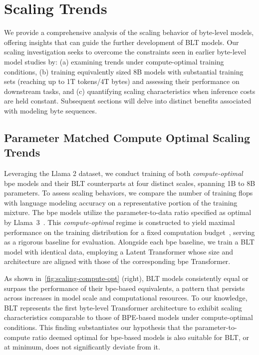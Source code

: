 \section{Scaling Trends}
\label{section:scaling}

We provide a comprehensive analysis of the scaling behavior of byte-level models, offering insights that can guide the further development of {\textsc BLT} models. Our scaling investigation seeks to overcome the constraints seen in earlier byte-level model studies by: (a) examining trends under compute-optimal training conditions, (b) training equivalently sized 8B models with substantial training sets (reaching up to 1T tokens/4T bytes) and assessing their performance on downstream tasks, and (c) quantifying scaling characteristics when inference costs are held constant. Subsequent sections will delve into distinct benefits associated with modeling byte sequences.

\subsection{Parameter Matched Compute Optimal Scaling Trends}
\label{section:parameter-matched-scaling}
Leveraging the Llama 2 dataset, we conduct training of both \textit{compute-optimal} bpe models and their {\textsc BLT} counterparts at four distinct scales, spanning 1B to 8B parameters. To assess scaling behaviors, we compare the number of training flops with language modeling accuracy on a representative portion of the training mixture. The bpe models utilize the parameter-to-data ratio specified as optimal by Llama~3~\citep{dubey2024llama}. This \textit{compute-optimal} regime is constructed to yield maximal performance on the training distribution for a fixed computation budget~\citep{hoffmann2022training}, serving as a rigorous baseline for evaluation. Alongside each bpe baseline, we train a {\textsc BLT} model with identical data, employing a Latent Transformer whose size and architecture are aligned with those of the corresponding bpe Transformer.

As shown in~\autoref{fig:scaling-compute-opt} (right), {\textsc BLT} models consistently equal or surpass the performance of their bpe-based equivalents, a pattern that persists across increases in model scale and computational resources. To our knowledge, {\textsc BLT} represents the first byte-level Transformer architecture to exhibit scaling characteristics comparable to those of BPE-based models under compute-optimal conditions. This finding substantiates our hypothesis that the parameter-to-compute ratio deemed optimal for bpe-based models is also suitable for {\textsc BLT}, or at minimum, does not significantly deviate from it.

